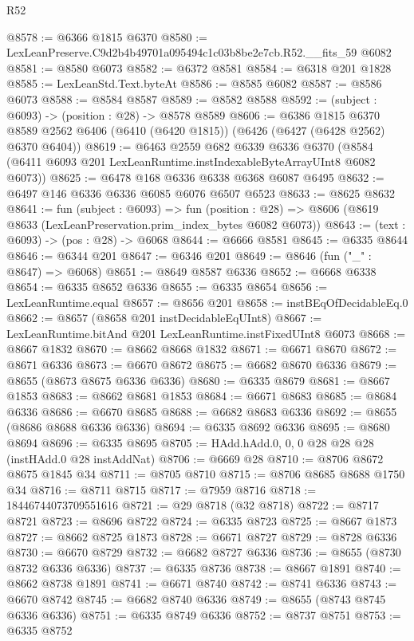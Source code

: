 \begin{lexlean}{R52}
\begin{coremodule}
@8578 := @6366 @1815 @6370
@8580 := LexLeanPreserve.C9d2b4b49701a095494c1c03b8be2e7cb.R52.__fits_59 @6082
@8581 := @8580 @6073
@8582 := @6372 @8581
@8584 := @6318 @201 @1828
@8585 := LexLeanStd.Text.byteAt
@8586 := @8585 @6082
@8587 := @8586 @6073
@8588 := @8584 @8587
@8589 := @8582 @8588
@8592 := (subject : @6093) -> (position : @28) -> @8578 @8589
@8606 := @6386
    @1815
    @6370
    @8589
    @2562
    @6406
    (@6410 (@6420 @1815))
    (@6426 (@6427 (@6428 @2562) @6370 @6404))
@8619 := @6463
    @2559
    @682
    @6339
    @6336
    @6370
    (@8584 (@6411 @6093 @201 LexLeanRuntime.instIndexableByteArrayUInt8 @6082 @6073))
@8625 := @6478 @168 @6336 @6338 @6368 @6087 @6495
@8632 := @6497 @146 @6336 @6336 @6085 @6076 @6507 @6523
@8633 := @8625 @8632
@8641 := fun (subject : @6093) =>
  fun (position : @28) => @8606 (@8619 @8633 (LexLeanPreservation.prim_index_bytes @6082 @6073))
@8643 := (text : @6093) -> (pos : @28) -> @6068
@8644 := @6666 @8581
@8645 := @6335 @8644
@8646 := @6344 @201
@8647 := @6346 @201
@8649 := @8646 (fun ("_" : @8647) => @6068)
@8651 := @8649 @8587 @6336
@8652 := @6668 @6338
@8654 := @6335 @8652 @6336
@8655 := @6335 @8654
@8656 := LexLeanRuntime.equal
@8657 := @8656 @201
@8658 := instBEqOfDecidableEq.{0}
@8662 := @8657 (@8658 @201 instDecidableEqUInt8)
@8667 := LexLeanRuntime.bitAnd @201 LexLeanRuntime.instFixedUInt8 @6073
@8668 := @8667 @1832
@8670 := @8662 @8668 @1832
@8671 := @6671 @8670
@8672 := @8671 @6336
@8673 := @6670 @8672
@8675 := @6682 @8670 @6336
@8679 := @8655 (@8673 @8675 @6336 @6336)
@8680 := @6335 @8679
@8681 := @8667 @1853
@8683 := @8662 @8681 @1853
@8684 := @6671 @8683
@8685 := @8684 @6336
@8686 := @6670 @8685
@8688 := @6682 @8683 @6336
@8692 := @8655 (@8686 @8688 @6336 @6336)
@8694 := @6335 @8692 @6336
@8695 := @8680 @8694
@8696 := @6335 @8695
@8705 := HAdd.hAdd.{0, 0, 0} @28 @28 @28 (instHAdd.{0} @28 instAddNat)
@8706 := @6669 @28
@8710 := @8706 @8672 @8675 @1845 @34
@8711 := @8705 @8710
@8715 := @8706 @8685 @8688 @1750 @34
@8716 := @8711 @8715
@8717 := @7959 @8716
@8718 := 18446744073709551616
@8721 := @29 @8718 (@32 @8718)
@8722 := @8717 @8721
@8723 := @8696 @8722
@8724 := @6335 @8723
@8725 := @8667 @1873
@8727 := @8662 @8725 @1873
@8728 := @6671 @8727
@8729 := @8728 @6336
@8730 := @6670 @8729
@8732 := @6682 @8727 @6336
@8736 := @8655 (@8730 @8732 @6336 @6336)
@8737 := @6335 @8736
@8738 := @8667 @1891
@8740 := @8662 @8738 @1891
@8741 := @6671 @8740
@8742 := @8741 @6336
@8743 := @6670 @8742
@8745 := @6682 @8740 @6336
@8749 := @8655 (@8743 @8745 @6336 @6336)
@8751 := @6335 @8749 @6336
@8752 := @8737 @8751
@8753 := @6335 @8752

\end{coremodule}
\end{lexlean}
